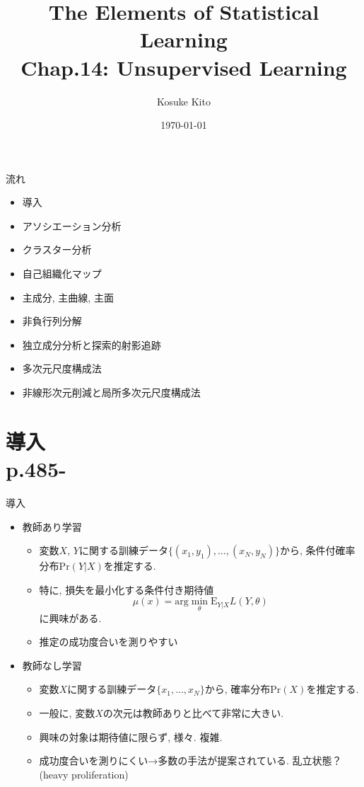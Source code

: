 \documentclass[dvipdfmx,8pt]{beamer}
\title{The Elements of Statistical Learning\\Chap.14: Unsupervised Learning}
\date{\today}
\author{Kosuke Kito}
\begin{document}
  \maketitle
  \begin{frame}{流れ}
    \begin{itemize}
      \item 導入
      \item アソシエーション分析
      \item クラスター分析
      \item 自己組織化マップ
      \item 主成分, 主曲線, 主面
      \item 非負行列分解
      \item 独立成分分析と探索的射影追跡
      \item 多次元尺度構成法
      \item 非線形次元削減と局所多次元尺度構成法
    \end{itemize}
  \end{frame}
  \section{導入\\p.485-}
  \begin{frame}{導入}
    \begin{itemize}
      \item 教師あり学習
        \begin{itemize}
          \item 変数$X$, $Y$に関する訓練データ$\{(x_1,y_1), \dots , (x_N, y_N)\}$から,
          条件付確率分布$\mathrm{Pr}(Y|X)$を推定する.

          \item 特に, 損失を最小化する条件付き期待値
          \[
            \mu(x)=\mathrm{arg}\min_{\theta} \mathrm{E}_{Y|X}L(Y,\theta)
          \]
          に興味がある.

          \item 推定の成功度合いを測りやすい

        \end{itemize}

      \item 教師なし学習
        \begin{itemize}
          \item 変数$X$に関する訓練データ$\{x_1 , \dots , x_N\}$から,
          確率分布$\mathrm{Pr}(X)$を推定する.

          \item 一般に, 変数$X$の次元は教師ありと比べて非常に大きい.

          \item 興味の対象は期待値に限らず, 様々. 複雑.

          \item 成功度合いを測りにくい→多数の手法が提案されている.
          乱立状態？(heavy proliferation)
        \end{itemize}
    \end{itemize}
  \end{frame}
\end{document}
